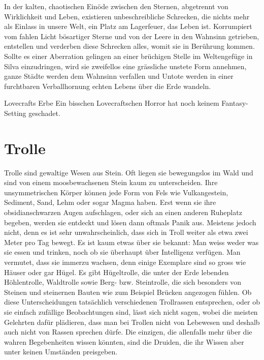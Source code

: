 \documentclass[10pt,twoside,twocolumn,openany]{book}
\begin{document}
In der kalten, chaotischen Einöde zwischen den Sternen, abgetrennt von Wirklichkeit und Leben, existieren unbeschreibliche Schrecken, die nichts mehr als Einlass in unsere Welt, ein Platz am Lagerfeuer, das Leben ist. Korrumpiert vom fahlen Licht bösartiger Sterne und von der Leere in den Wahnsinn getrieben, entstellen und verderben diese Schrecken alles, womit sie in Berührung kommen. Sollte es einer Aberration gelingen an einer brüchigen Stelle im Weltengefüge in Silva einzudringen, wird sie zweifellos eine grässliche unstete Form annehmen, ganze Städte werden dem Wahnsinn verfallen und Untote werden in einer furchtbaren Verballhornung echten Lebens über die Erde wandeln.

\begin{commentbox}{Lovecrafts Erbe}
	Ein bisschen Lovecraftschen Horror hat noch keinem Fantasy-Setting geschadet.
\end{commentbox}



\section{Trolle} 

Trolle sind gewaltige Wesen aus Stein. Oft liegen sie bewegungslos im Wald und sind von einem moosbewachsenen Stein kaum zu unterscheiden. Ihre unsymmetrischen Körper können jede Form von Fels wie Vulkangestein, Sediment, Sand, Lehm oder sogar Magma haben. Erst wenn sie ihre obsidianschwarzen Augen aufschlagen, oder sich an einen anderen Ruheplatz begeben, werden sie entdeckt und lösen dann oftmals Panik aus. Meistens jedoch nicht, denn es ist sehr unwahrscheinlich, dass sich in Troll weiter als etwa zwei Meter pro Tag bewegt. Es ist kaum etwas über sie bekannt: Man weiss weder was sie essen und trinken, noch ob sie überhaupt über Intelligenz verfügen. Man vermutet, dass  sie immerzu wachsen, denn einige Exemplare sind so gross wie Häuser oder gar Hügel. Es gibt Hügeltrolle, die unter der Erde lebenden Höhlentrolle, Waldtrolle sowie Berg- bzw. Steintrolle, die sich besonders von Steinen und steinernen Bauten wie zum Beispiel Brücken angezogen fühlen.
Ob diese Unterscheidungen tatsächlich verschiedenen Trollrassen entsprechen, oder ob sie einfach zufällige Beobachtungen sind, lässt sich nicht sagen, wobei die meisten Gelehrten dafür plädieren, dass man bei Trollen nicht von Lebewesen und deshalb auch nicht von Rassen sprechen dürfe.
Die einzigen, die allenfalls mehr über die wahren Begebenheiten wissen könnten, sind die Druiden, die ihr Wissen aber unter keinen Umständen preisgeben.
\end{document}
